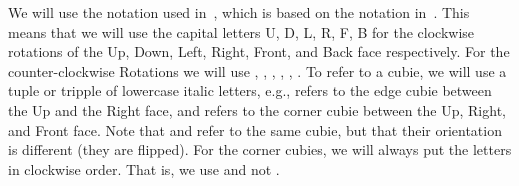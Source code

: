 We will use the notation used in~\cite[Ch. 14]{Hofstadter}, which is based on the notation in~\cite{FreySingmaster}.
This means that we will use the capital letters \rr U, \rr D, \rr L, \rr R, \rr F, \rr B for the clockwise rotations of the Up, Down, Left, Right, Front, and Back face respectively.
For the counter-clockwise Rotations we will use , , , , , .
To refer to a cubie, we will use a tuple or tripple of lowercase italic letters, e.g.,  refers to the edge cubie between the Up and the Right face, and  refers to the corner cubie between the Up, Right, and Front face.
Note that  and  refer to the same cubie, but that their orientation is different (they are flipped).
For the corner cubies, we will always put the letters in clockwise order.
That is, we use  and not .
